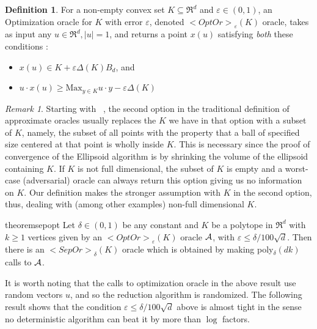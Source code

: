 \documentclass[11pt,letterpaper]{article}
\newcounter{note}[section]
\def\mathsf#1{<#1>}%
\theoremstyle{definition}
\newtheorem{defn}[theorem]{Definition}
\theoremstyle{remark}
\newtheorem{remark}[theorem]{Remark}
\newcommand{\sep}{{\mathsf{SepOr}}}
\newcommand{\opto}{{\mathsf{OptOr}}}
\begin{document}
\begin{defn}\label{olp}
For a non-empty convex set $K\subseteq \Re^d$ and $\varepsilon\in (0,1)$, an Optimization oracle for $K$ with error $\varepsilon$, denoted $\opto_\varepsilon(K)$ oracle,  takes as input any $u\in \Re^d, |u|=1$, and returns a point $x(u)$ satisfying {\em both} these conditions :
\begin{itemize}
\item $x(u)\in K+\varepsilon\Delta(K)B_d$, and
\item $u\cdot x(u)\geq \mbox{Max}_{y\in K}u\cdot y-\varepsilon\Delta(K)$
\end{itemize}
\end{defn}

\begin{remark}\label{approx-oracles}
Starting with ~\cite{GLS1988}, the second option in the traditional definition of approximate oracles usually replaces the $K$ we have in that option with a subset of $K$, namely, the subset of all points with the property that a ball of specified size centered at that point is wholly inside $K$. This is necessary since the proof of convergence of the Ellipsoid algorithm is by shrinking the volume of the ellipsoid containing $K$.
If $K$ is not full dimensional, the subset of $K$ is empty and a worst-case (adversarial) oracle can always return this option giving us no information on $K$. Our definition makes the stronger assumption  with $K$ in the second option, thus, dealing with (among other examples) non-full dimensional $K$.
\end{remark}

\begin{restatable}{theorem}{sepopt}
\label{thm-sep-to-opt}
Let $\delta \in (0,1)$ be any constant and $K$ be  a polytope in $\Re^d$ with $k\geq 1$ vertices  given by an  $ \opto_\varepsilon(K)$ oracle $\cal A$, with $\varepsilon\leq \delta/100 \sqrt{d}$. Then there is an $\sep_\delta(K)$ oracle which is obtained by making  poly$_\delta (dk)$ calls to $\cal A$. 
\end{restatable}

It is worth noting that the  calls to optimization oracle in the above result use random vectors $u$, and so the reduction algorithm is randomized. The following result shows that the condition $\varepsilon\leq \delta/100 \sqrt{d}$ above is almost tight in the sense no deterministic algorithm can beat it by more than $\log$ factors. 
\end{document}
